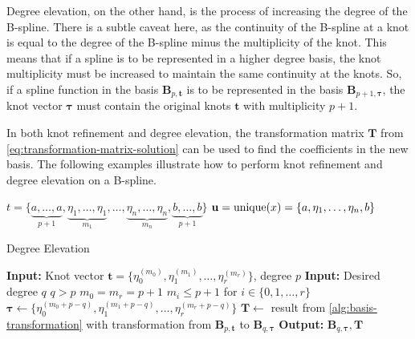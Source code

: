 Degree elevation, on the other hand, is the process of increasing the degree of the B-spline. There is a subtle caveat here, as the continuity of the B-spline at a knot is equal to the degree of the B-spline minus the multiplicity of the knot. This means that if a spline is to be represented in a higher degree basis, the knot multiplicity must be increased to maintain the same continuity at the knots. So, if a spline function in the basis $\mathbf B_{p,\mathbf t}$ is to be represented in the basis $\mathbf B_{p+1,\boldsymbol \tau}$, the knot vector $\boldsymbol \tau$ must contain the original knots $\mathbf t$ with multiplicity $p+1$.

In both knot refinement and degree elevation, the transformation matrix $\mathbf T$ from \cref{eq:transformation-matrix-solution} can be used to find the coefficients in the new basis. The following examples illustrate how to perform knot refinement and degree elevation on a B-spline.

$t = \{\underbrace{a, \dots, a}_{p+1}, \underbrace{\eta_1, \dots, \eta_1}_{m_1}, \dots, \underbrace{\eta_{n}, \dots, \eta_{n}}_{m_n}, \underbrace{b, \dots, b}_{p+1}\}$
$\mathbf u = \operatorname{unique}(x) = \{a, \eta_1, \dots, \eta_n, b\}$

\begin{algorithm}
    \caption{Degree Elevation}\label{alg:degree-elevation}
    \begin{algorithmic}[1]
        \State \textbf{Input:} Knot vector $\mathbf t = \{\eta_0^{(m_0)}, \eta_1^{(m_1)}, \dots, \eta_r^{(m_r)}\}$, degree $p$
        \State \textbf{Input:} Desired degree $q$
        \Ensure $q > p$
        \Ensure $m_0 = m_r = p+1$
        \Ensure $m_i \leq p+1$ for $i \in \{0,1,\ldots,r\}$
        \State $\boldsymbol\tau \gets \{\eta_0^{(m_0+p-q)}, \eta_1^{(m_1+p-q)}, \dots, \eta_r^{(m_r+p-q)}\}$
        \State $\mathbf T \gets $ result from \cref{alg:basis-transformation} with transformation from $\mathbf B_{p,\mathbf t}$ to $\mathbf B_{q,\boldsymbol \tau}$
        \State \textbf{Output:} $\mathbf B_{q, \boldsymbol \tau}, \mathbf T$
    \end{algorithmic}
\end{algorithm}


